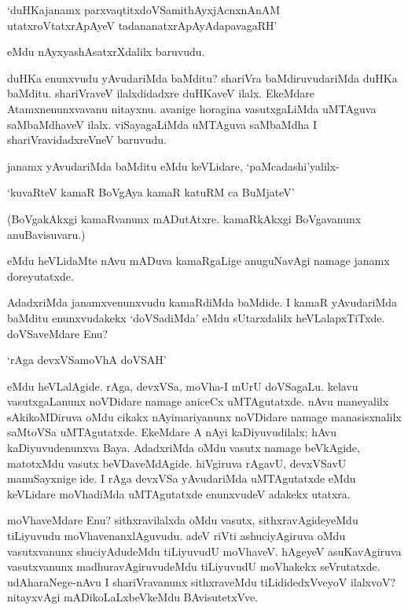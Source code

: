 \begin{shloka}
`duHKajanamx parxvaqtitxdoVSamithAyxjAcnxnAnAM\\
utatxroVtatxrApAyeV tadananatxrApAyAdapavagaRH'
\end{shloka}

\noindent eMdu nAyxyashAsatxrXdalilx baruvudu.

duHKa enunxvudu yAvudariMda baMditu? shariVra baMdiruvudariMda duHKa baMditu. shariVraveV ilalxdidadxre duHKaveV ilalx. EkeMdare Atamxnenunxvavanu nitayxnu. avanige horagina vasutxgaLiMda uMTAguva saMbaMdhaveV ilalx. viSayagaLiMda uMTAguva saMbaMdha I shariVravidadxreVneV baruvudu.

janamx yAvudariMda baMditu eMdu keVLidare, `paMcadashi'yalilx-

\begin{shloka}
`kuvaRteV kamaR BoVgAya kamaR katuRM ca BuMjateV'
\end{shloka}

(BoVgakAkxgi kamaRvanunx mADutAtxre. kamaRkAkxgi BoVgavanunx anuBavisuvaru.)

eMdu heVLidaMte nAvu mADuva kamaRgaLige anuguNavAgi namage janamx doreyutatxde.

AdadxriMda janamxvenunxvudu kamaRdiMda baMdide. I kamaR yAvudariMda baMditu enunxvudakekx `doVSadiMda' eMdu sUtarxdalilx heVLalapxTiTxde. doVSaveMdare Enu?

\begin{shloka}
`rAga devxVSamoVhA doVSAH'
\end{shloka}

\noindent eMdu heVLalAgide. rAga, devxVSa, moVha-I mUrU doVSagaLu. kelavu vasutxgaLanunx noVDidare namage aniceCx uMTAgutatxde. nAvu maneyalilx sAkikoMDiruva oMdu cikakx nAyimariyanunx noVDidare namage manasisxnalilx saMtoVSa uMTAgutatxde. EkeMdare A nAyi kaDiyuvudilalx; hAvu kaDiyuvudenunxva Baya. AdadxriMda oMdu vasutx namage beVkAgide, matotxMdu vasutx beVDaveMdAgide. hiVgiruva rAgavU, devxVSavU manuSayxnige ide. I rAga devxVSa yAvudariMda uMTAgutatxde eMdu keVLidare moVhadiMda uMTAgutatxde enunxvudeV adakekx utatxra.

moVhaveMdare Enu? sithxravilalxda oMdu vasutx, sithxravAgideyeMdu tiLiyuvudu moVhavenanxlAguvudu. adeV riVti ashuciyAgiruva oMdu vasutxvanunx shuciyAdudeMdu tiLiyuvudU moVhaveV. hAgeyeV asuKavAgiruva vasutxvanunx madhuravAgiruvudeMdu tiLiyuvudU moVhakekx seVrutatxde. udAharaNege-nAvu I shariVravanunx sithxraveMdu tiLididedxVveyoV ilalxvoV? nitayxvAgi mADikoLaLxbeVkeMdu BAvisutetxVve.

